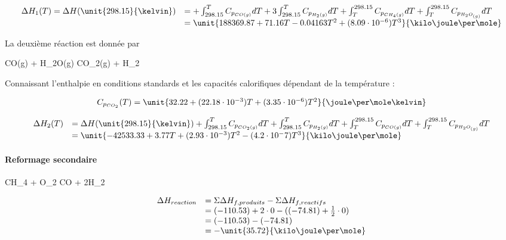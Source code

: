$$
	\begin{array}{rl}
		 	\Delta H_1(T) = \Delta H(\unit{298.15}{\kelvin})	&=  + \int_{298.15}^{T} C_{p_{CO(g)}} dT + 3\int_{298.15}^{T} C_{p_{H_2(g)}} dT 
																														+  \int_{T}^{298.15} C_{p_{CH_4(g)}} dT + \int_{T}^{298.15}C_{p_{H_{2}O_{(g)}}}dT\\
																												&=  \unit{188369.87 + 71.16 T -0.04163 T^2 + (8.09\cdot 10^{-6}) T^3}{\kilo\joule\per\mole} %
	\end{array}
$$	

La deuxième réaction est donnée par 
\begin{chemmath} 
	CO(g) + H_{2}O(g) \Leftrightarrow CO_2(g) + H_2
\end{chemmath} 

Connaissant l'enthalpie en conditions standards \cite{atkins} et les capacités calorifiques dépendant de la température \cite{hc-table}:

$$
\begin{array}{rl}
C_{p_{CO_2}}(T) = \unit{32.22 +(22.18 \cdot 10^{-3})T + (3.35 \cdot 10^{-6})T^2}{\joule\per\mole\kelvin} \\
\end{array}
$$

$$
	\begin{array}{rl}
		  \Delta H_2(T)	&=   \Delta H(\unit{298.15}{\kelvin}) 
											 + \int_{298.15}^{T} C_{p_{CO_2(g)}} dT + \int_{298.15}^{T} C_{p_{H_2(g)}} dT 
											 +  \int_{T}^{298.15} C_{p_{CO(g)}} dT + \int_{T}^{298.15}C_{p_{H_{2}O_{(g)}}}dT \\
										&=  \unit{-42533.33+3.77T+(2.93\cdot 10^{-3})T^2-(4.2\cdot 10^-7)T^3}{\kilo\joule\per\mole}
	\end{array}
$$	

\paragraph{Reformage secondaire}

\begin{chemmath}
		CH_4 + O_2 \Longrightarrow CO + 2H_2
\end{chemmath}

$$
	\begin{array}{rl}
	\Delta H_{reaction}		&= \Sigma \Delta H_{f,produits} - \Sigma \Delta H_{f,reactifs}\\
												&= (-110.53) + 2\cdot 0 - ((-74.81) + \frac{1}{2}\cdot 0)\\
												&=  (-110.53) - (-74.81)\\
												&=  -\unit{35.72}{\kilo\joule\per\mole}
	\end{array}
$$

